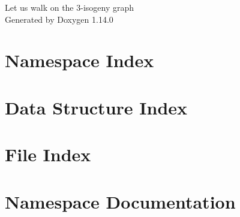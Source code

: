 \documentclass[twoside]{book}
\newcommand{\+}{\discretionary{\mbox{\scriptsize$\hookleftarrow$}}{}{}}
\newcommand{\clearemptydoublepage}{%
    \newpage{\pagestyle{empty}\cleardoublepage}%
  }
\begin{document}
  \raggedbottom
    \hypersetup{pageanchor=false,
                bookmarksnumbered=true,
                pdfencoding=unicode
               }
  \begin{titlepage}
  \vspace*{7cm}
  \begin{center}%
  {\Large Let us walk on the 3-\/isogeny graph}\\
  \vspace*{1cm}
  {\large Generated by Doxygen 1.14.0}\\
  \end{center}
  \end{titlepage}
  \clearemptydoublepage
  \tableofcontents
  \clearemptydoublepage
  \hypersetup{pageanchor=true}


\chapter{Namespace Index}

\chapter{Data Structure Index}

\chapter{File Index}

\chapter{Namespace Documentation}




















\end{document}
